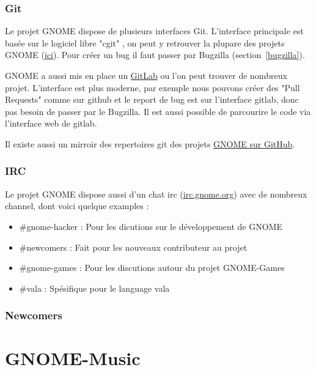 \documentclass[12pt]{report}
\begin{document}
\subsection{Git}
\label{git}

\label{cgit}
Le projet GNOME dispose de plusieurs interfaces Git. L'interface 
principale est basée sur le logiciel libre "cgit"
, on peut y retrouver la plupare des projets GNOME 
(\href{https://git.gnome.org/}{ici}). Pour créer un bug il faut passer par Bugzilla
(section~\ref{bugzilla}).

\label{gitlab}
GNOME a aussi mis en place un \href{https://gitlab.gnome.org/GNOME}{GitLab} 
ou l'on peut trouver de nombreux projet. L'interface est plus moderne,
par exemple nous pouvons créer des "Pull Requests" comme sur github
et le report de bug est sur l'interface gitlab, donc pas besoin de passer
par le Bugzilla. Il est aussi possible de parcourire le code via l'interface
web de gitlab.

\label{github}
Il existe aussi un mirroir des repertoires git des projets 
\href{https://github.com/GNOME}{GNOME sur GitHub}.

\subsection{IRC}
Le projet GNOME dispose aussi d'un chat irc (\href{irc.gnome.org}{irc.gnome.org})
avec de nombreux channel, dont voici quelque examples :
\begin{itemize}
\item \#gnome-hacker : Pour les dicutions sur le développement de GNOME
\item \#newcomers : Fait pour les nouveaux contributeur au projet
\item \#gnome-games : Pour les discutions autour du projet GNOME-Games
\item \#vala : Spésifique pour le language vala
\end{itemize}

\subsection{Newcomers}

\newpage
\chapter{GNOME-Music}
\end{document}
